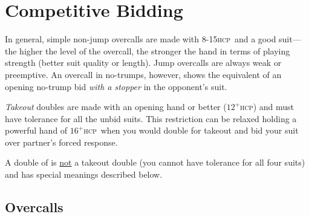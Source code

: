 \documentclass[a4paper,article,oneside]{memoir}
\newcommand{\hcp}{\textsc{hcp}}
\begin{document}
\pagebreak

\section{Competitive Bidding}

In general, simple non-jump overcalls are made with 8-15\hcp\ and
a good suit---the higher the level of the overcall, the stronger the
hand in terms of playing strength (better suit quality or length).
Jump overcalls are always weak or preemptive. An overcall in
no-trumps, however, shows the equivalent of an opening no-trump bid
\emph{with a stopper} in the opponent's suit.

\emph{Takeout} doubles are made with an opening hand or better
($12^+$\hcp) and must have tolerance for all the unbid suits. This
restriction can be relaxed holding a powerful hand of $16^+$\hcp\ when you
would double for takeout and bid your suit over partner's forced
response.

A double of  is \underline{not} a takeout double (you
cannot have tolerance for all four suits) and has special meanings
described below.

\subsection{Overcalls}
\end{document}
